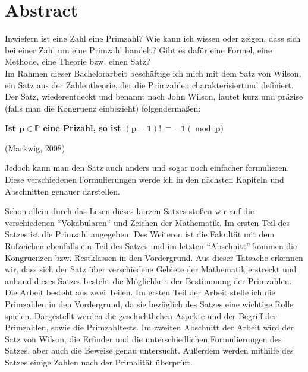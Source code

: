 %
%

\chapter{Abstract}

Inwiefern ist eine Zahl eine Primzahl? Wie kann ich wissen oder zeigen,
dass sich bei einer Zahl um eine Primzahl handelt? Gibt es dafür eine
Formel, eine Methode, eine Theorie bzw. einen Satz?\\

Im Rahmen dieser Bachelorarbeit beschäftige ich mich mit dem Satz von
Wilson, ein Satz aus der Zahlentheorie, der die Primzahlen
charakterisiertund definiert. Der Satz, wiederentdeckt und benannt nach
John Wilson, lautet kurz und präzise (falls man die Kongruenz einbezieht)
folgendermaßen:

\begin{center}
    \textbf{Ist $\bm{ p \in} \mathbb{P}$ eine Prizahl, so ist $\bm{ (p-1)! \:\equiv -1} \;\bm ( \bmod \bm{p)}$}
    
    (Markwig, 2008)~\cite{markwig}
\end{center}

Jedoch kann man den Satz auch anders und sogar noch einfacher formulieren.
Diese verschiedenen Formulierungen werde ich in den nächsten Kapiteln und
Abschnitten genauer darstellen.

Schon allein durch das Lesen dieses kurzen Satzes stoßen wir auf die
verschiedenen ``Vokabularen`` und Zeichen der Mathematik. Im ersten Teil
des Satzes ist die Primzahl angegeben. Des Weiteren ist die Fakultät mit
dem Rufzeichen ebenfalls ein Teil des Satzes und im letzten ``Abschnitt''
kommen die Kongruenzen bzw. Restklassen in den Vordergrund. Aus dieser
Tatsache erkennen wir, dass sich der Satz über verschiedene Gebiete der
Mathematik erstreckt und anhand dieses Satzes besteht die Möglichkeit
der Bestimmung der Primzahlen.\\

Die Arbeit besteht aus zwei Teilen. Im ersten Teil der Arbeit stelle ich
die Primzahlen in den Vordergrund, da sie bezüglich des Satzes eine
wichtige Rolle spielen. Dargestellt werden die geschichtlichen Aspekte
und der Begriff der Primzahlen, sowie die Primzahltests.
Im zweiten Abschnitt der Arbeit wird der Satz von Wilson, die Erfinder
und die unterschiedlichen Formulierungen des Satzes, aber auch die
Beweise genau untersucht. Außerdem werden mithilfe des Satzes einige
Zahlen nach der Primalität überprüft.
\newpage

